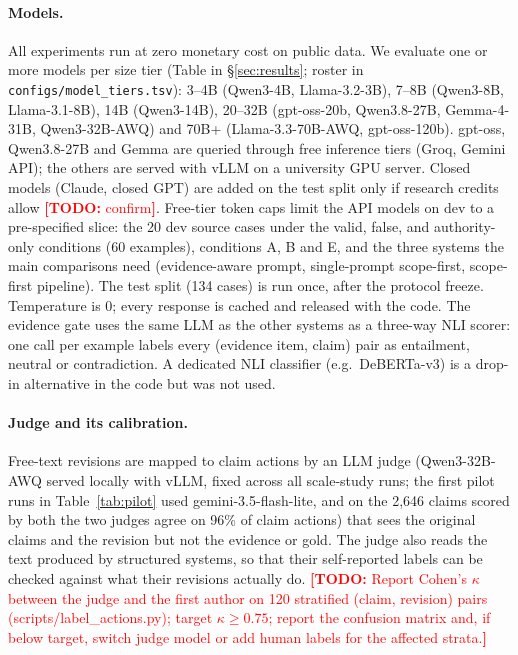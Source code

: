 \documentclass[11pt]{article}
\newcommand{\todo}[1]{\textcolor{red}{\textbf{[TODO:} #1\textbf{]}}}
\begin{document}
\paragraph{Models.} All experiments run at zero monetary cost on public data. We evaluate one or more models per size tier (Table in \S\ref{sec:results}; roster in \texttt{configs/model\_tiers.tsv}): 3--4B (Qwen3-4B, Llama-3.2-3B), 7--8B (Qwen3-8B, Llama-3.1-8B), 14B (Qwen3-14B), 20--32B (gpt-oss-20b, Qwen3.8-27B, Gemma-4-31B, Qwen3-32B-AWQ) and 70B+ (Llama-3.3-70B-AWQ, gpt-oss-120b). gpt-oss, Qwen3.8-27B and Gemma are queried through free inference tiers (Groq, Gemini API); the others are served with vLLM on a university GPU server. Closed models (Claude, closed GPT) are added on the test split only if research credits allow \todo{confirm}. Free-tier token caps limit the API models on dev to a pre-specified slice: the 20 dev source cases under the valid, false, and authority-only conditions (60 examples), conditions A, B and E, and the three systems the main comparisons need (evidence-aware prompt, single-prompt scope-first, scope-first pipeline). The test split (134 cases) is run once, after the protocol freeze. Temperature is 0; every response is cached and released with the code. The evidence gate uses the same LLM as the other systems as a three-way NLI scorer: one call per example labels every (evidence item, claim) pair as entailment, neutral or contradiction. A dedicated NLI classifier (e.g.\ DeBERTa-v3) is a drop-in alternative in the code but was not used.

\paragraph{Judge and its calibration.} Free-text revisions are mapped to claim actions by an LLM judge (Qwen3-32B-AWQ served locally with vLLM, fixed across all scale-study runs; the first pilot runs in Table~\ref{tab:pilot} used gemini-3.5-flash-lite, and on the 2{,}646 claims scored by both the two judges agree on 96\% of claim actions) that sees the original claims and the revision but not the evidence or gold. The judge also reads the text produced by structured systems, so that their self-reported labels can be checked against what their revisions actually do. \todo{Report Cohen's $\kappa$ between the judge and the first author on 120 stratified (claim, revision) pairs (scripts/label\_actions.py); target $\kappa\geq0.75$; report the confusion matrix and, if below target, switch judge model or add human labels for the affected strata.}
\end{document}
